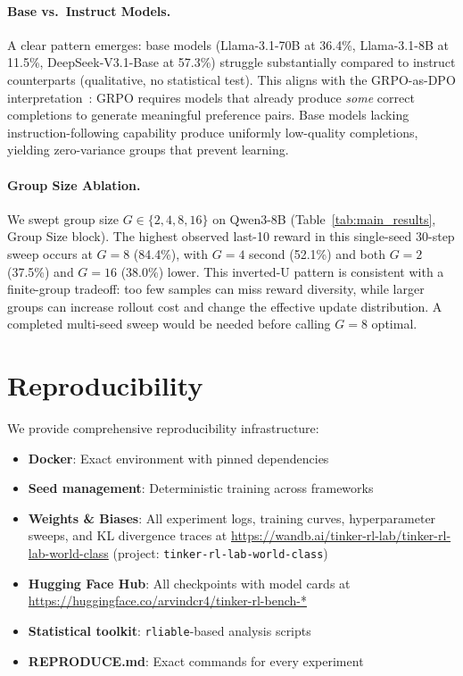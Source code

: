 \paragraph{Base vs.~Instruct Models.}
A clear pattern emerges: base models (Llama-3.1-70B at 36.4\%, Llama-3.1-8B at 11.5\%, DeepSeek-V3.1-Base at 57.3\%) struggle substantially compared to instruct counterparts (qualitative, no statistical test).
This aligns with the GRPO-as-DPO interpretation~\cite{wu2025grpo_dpo}: GRPO requires models that already produce \emph{some} correct completions to generate meaningful preference pairs.
Base models lacking instruction-following capability produce uniformly low-quality completions, yielding zero-variance groups that prevent learning.

\paragraph{Group Size Ablation.}
We swept group size $G \in \{2, 4, 8, 16\}$ on Qwen3-8B (Table~\ref{tab:main_results}, Group Size block).
The highest observed last-10 reward in this single-seed 30-step sweep occurs at
$G{=}8$ (84.4\%), with $G{=}4$ second (52.1\%) and both $G{=}2$ (37.5\%) and
$G{=}16$ (38.0\%) lower. This inverted-U pattern is consistent with a finite-group
tradeoff: too few samples can miss reward diversity, while larger groups can
increase rollout cost and change the effective update distribution. A completed
multi-seed sweep would be needed before calling $G{=}8$ optimal.

\section{Reproducibility}
\label{sec:reproducibility}

We provide comprehensive reproducibility infrastructure:
\begin{itemize}
    \item \textbf{Docker}: Exact environment with pinned dependencies
    \item \textbf{Seed management}: Deterministic training across frameworks
    \item \textbf{Weights \& Biases}: All experiment logs, training curves,
    hyperparameter sweeps, and KL divergence traces at
    \url{https://wandb.ai/tinker-rl-lab/tinker-rl-lab-world-class}
    (project: \texttt{tinker-rl-lab-world-class})
    \item \textbf{Hugging Face Hub}: All checkpoints with model cards at
    \url{https://huggingface.co/arvindcr4/tinker-rl-bench-*}
    \item \textbf{Statistical toolkit}: \texttt{rliable}-based analysis scripts
    \item \textbf{REPRODUCE.md}: Exact commands for every experiment
\end{itemize}

